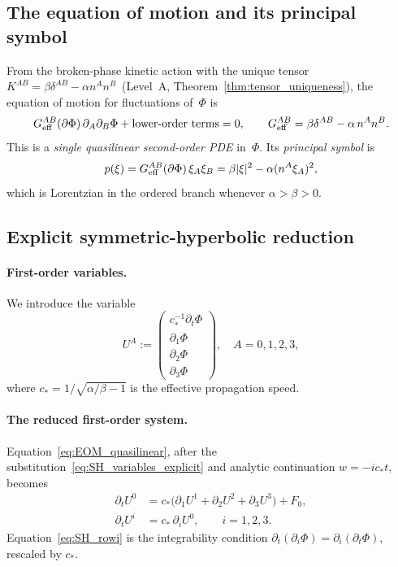 \documentclass[11pt,a4paper]{article}
\numberwithin{equation}{section}
\begin{document}
\subsection*{The equation of motion and its principal symbol}

From the broken-phase kinetic action with the unique
tensor~$K^{AB}=\beta\delta^{AB}-\alpha n^A n^B$~(Level~A,
Theorem~\ref{thm:tensor_uniqueness}), the equation of motion for
fluctuations of~$\Phi$ is
\begin{equation}
  G^{AB}_{\rm eff}(\partial\Phi)\,\partial_A\partial_B\Phi
  + \text{lower-order terms} = 0,
  \qquad
  G^{AB}_{\rm eff} = \beta\delta^{AB} - \alpha\,n^A n^B.
  \label{eq:EOM_quasilinear}
\end{equation}
This is a \emph{single quasilinear second-order PDE} in~$\Phi$.
Its \emph{principal symbol} is
\begin{equation}
  p(\xi) = G^{AB}_{\rm eff}(\partial\Phi)\,\xi_A\xi_B
  = \beta|\xi|^2 - \alpha(n^A\xi_A)^2,
\end{equation}
which is Lorentzian in the ordered branch whenever $\alpha>\beta>0$.

\subsection*{Explicit symmetric-hyperbolic reduction}

\paragraph{First-order variables.}
We introduce the variable
\begin{equation}
  U^A :=
  \begin{pmatrix} c_*^{-1}\partial_t\Phi \\
                  \partial_1\Phi \\
                  \partial_2\Phi \\
                  \partial_3\Phi \end{pmatrix},
  \quad A=0,1,2,3,
  \label{eq:SH_variables_explicit}
\end{equation}
where $c_* = 1/\sqrt{\alpha/\beta - 1}$ is the effective propagation speed.

\paragraph{The reduced first-order system.}
Equation~\eqref{eq:EOM_quasilinear}, after the
substitution~\eqref{eq:SH_variables_explicit} and analytic continuation
$w=-ic_*t$, becomes
\begin{align}
  \partial_t U^0 &= c_*\bigl(\partial_1 U^1 + \partial_2 U^2
                              + \partial_3 U^3\bigr) + F_0,
  \label{eq:SH_row0}\\
  \partial_t U^i &= c_*\,\partial_i U^0,
  \qquad i=1,2,3.
  \label{eq:SH_rowi}
\end{align}
Equation~\eqref{eq:SH_rowi} is the integrability condition
$\partial_t(\partial_i\Phi)=\partial_i(\partial_t\Phi)$,
rescaled by $c_*$.
\end{document}
